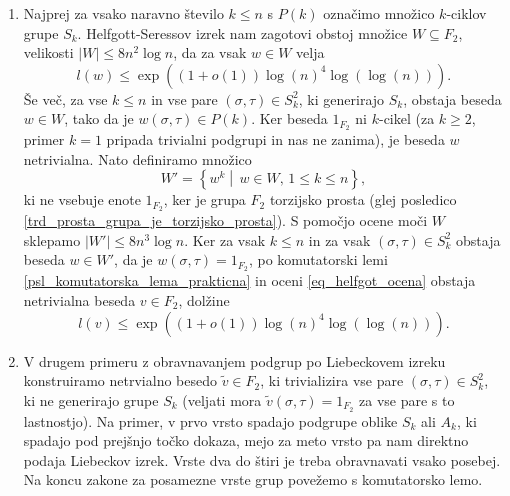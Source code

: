 \begin{enumerate}
    \item Najprej za vsako naravno število $k \le n$ s $P(k)$ označimo množico $k$-ciklov grupe $S_k$. Helfgott-Seressov izrek nam zagotovi obstoj množice $W \subseteq F_2$, velikosti $\lvert W \rvert \le 8n^2 \log n$, da za vsak $w \in W$ velja \begin{equation}\label{eq_helfgot_ocena}
        l(w) \le \exp((1 + o(1)) \log(n)^{4} \log(\log(n))).
    \end{equation}  
    Še več, za vse $k \le n$ in vse pare $(\sigma, \tau) \in S_k^2$, ki generirajo $S_k$,
    obstaja beseda $w \in W$, tako da je $w(\sigma, \tau) \in P(k)$. Ker beseda $1_{F_2}$ ni $k$-cikel (za $k \ge 2$, primer $k = 1$ pripada trivialni podgrupi in nas ne zanima), je beseda $w$ netrivialna. Nato definiramo množico \begin{equation*}
    W' = \left\{ w^{k}  \middle|\,  w \in W , \, 1 \le  k \le  n \right\}, 
    \end{equation*}  
    ki ne vsebuje enote $1_{F_2}$, ker je grupa $F_2$ torzijsko prosta (glej posledico \ref{trd_prosta_grupa_je_torzijsko_prosta}). S pomočjo ocene moči $W$ sklepamo $\lvert W' \rvert \le 8 n^3 \log n$.
    Ker za vsak $k \le n$ in za vsak $(\sigma, \tau) \in S_k^2$ obstaja beseda $w \in W'$, da je $w(\sigma, \tau) = 1_{F_2}$, po komutatorski lemi \ref{psl_komutatorska_lema_prakticna} in oceni \ref{eq_helfgot_ocena} obstaja netrivialna beseda $v \in F_2$, dolžine
    \begin{equation*}
    l(v) \le \exp((1 + o(1)) \log(n)^{4} \log(\log(n))).
    \end{equation*}  
    \item V drugem primeru z obravnavanjem podgrup po Liebeckovem izreku konstruiramo netrvialno besedo $\tilde{v} \in F_2$, ki trivializira vse pare $(\sigma, \tau) \in S_k^2$, ki ne generirajo
    grupe $S_k$ (veljati mora $\tilde{v}(\sigma, \tau) = 1_{F_2}$ za vse pare s to lastnostjo). Na primer, v prvo vrsto spadajo podgrupe oblike $S_k$ ali $A_k$, ki spadajo pod prejšnjo točko dokaza, mejo za meto vrsto pa nam direktno podaja Liebeckov izrek. Vrste dva do štiri je treba obravnavati
    vsako posebej. Na koncu zakone za posamezne vrste grup povežemo s komutatorsko lemo.    
\end{enumerate}


